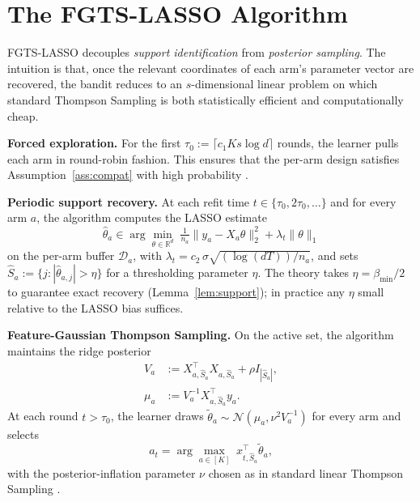 \documentclass[10pt,journal,twoside,twocolumn]{IEEEtran}
\begin{document}
\section{The FGTS-LASSO Algorithm}\label{sec:algo}

FGTS-LASSO decouples \emph{support identification} from \emph{posterior sampling}. The intuition is that, once the relevant coordinates of each arm's parameter vector are recovered, the bandit reduces to an $s$-dimensional linear problem on which standard Thompson Sampling is both statistically efficient and computationally cheap.

\textbf{Forced exploration.} For the first $\tau_0 := \lceil c_1 K s \log d \rceil$ rounds, the learner pulls each arm in round-robin fashion. This ensures that the per-arm design satisfies Assumption~\ref{ass:compat} with high probability \cite{bastani2020online}.

\textbf{Periodic support recovery.} At each refit time $t \in \{\tau_0, 2\tau_0, \dots\}$ and for every arm $a$, the algorithm computes the LASSO estimate
\begin{equation}
\hat{\theta}_a \in \arg\min_{\theta \in \mathbb{R}^d}\; \tfrac{1}{n_a} \|y_a - X_a \theta\|_2^2 + \lambda_t \|\theta\|_1
\label{eq:lasso}
\end{equation}
on the per-arm buffer $\mathcal{D}_a$, with $\lambda_t = c_2\, \sigma \sqrt{(\log(dT))/n_a}$, and sets $\hat{S}_a := \{j : |\hat\theta_{a,j}| > \eta\}$ for a thresholding parameter $\eta$. The theory takes $\eta = \beta_{\min}/2$ to guarantee exact recovery (Lemma~\ref{lem:support}); in practice any $\eta$ small relative to the LASSO bias suffices.

\textbf{Feature-Gaussian Thompson Sampling.} On the active set, the algorithm maintains the ridge posterior
\begin{align}
V_a &:= X_{a,\hat{S}_a}^\top X_{a,\hat{S}_a} + \rho I_{|\hat{S}_a|}, \label{eq:posterior_cov}\\
\mu_a &:= V_a^{-1} X_{a,\hat{S}_a}^\top y_a. \label{eq:posterior_mean}
\end{align}
At each round $t > \tau_0$, the learner draws $\tilde{\theta}_a \sim \mathcal{N}(\mu_a, \nu^2 V_a^{-1})$ for every arm and selects
\begin{equation}
a_t = \arg\max_{a \in [K]}\; x_{t,\hat{S}_a}^\top \tilde{\theta}_a,
\label{eq:action}
\end{equation}
with the posterior-inflation parameter $\nu$ chosen as in standard linear Thompson Sampling \cite{agrawal2013thompson}.
\end{document}
